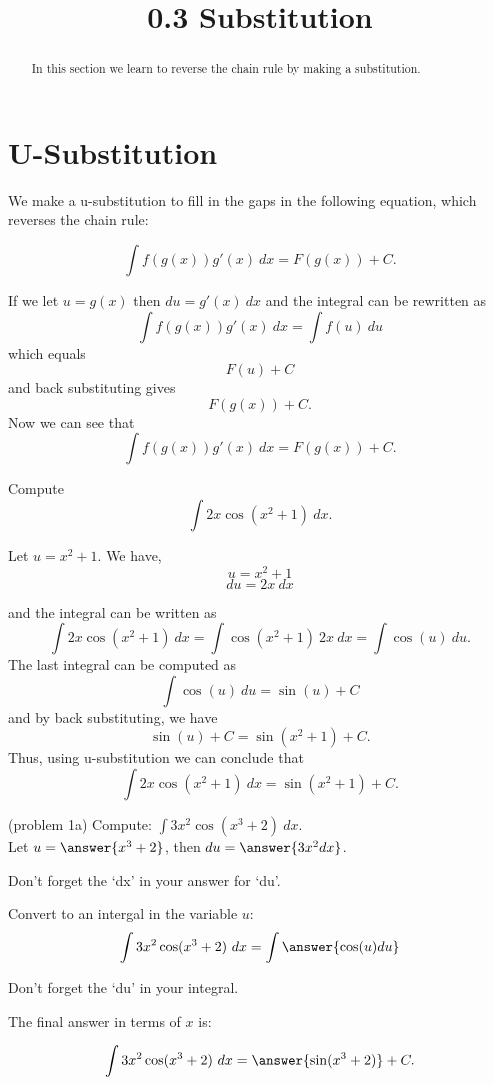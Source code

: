 \documentclass{ximera}
\title{0.3 Substitution}
\begin{document}
\begin{abstract}
In this section we learn to reverse the chain rule by making a substitution.
\end{abstract}

\maketitle

\section{U-Substitution}

We make a u-substitution to fill in the gaps in the following equation, which reverses the chain rule:

\[\int f(g(x))g'(x) \ dx = F(g(x)) + C. \]

If we let $ u = g(x)$ then $du = g'(x) \ dx$ and the integral can be rewritten as
\[\int f(g(x))g'(x) \ dx = \int f(u) \ du \]
which equals
\[F(u) + C\]
and back substituting gives
\[F(g(x)) + C. \]
Now we can see that
\[\int f(g(x))g'(x) \ dx = F(g(x)) + C. \]



\begin{example}[example 1]
Compute 
\[\int 2x\cos(x^2 + 1) \ dx.\]

Let $u = x^2 + 1$.  We have,
\[u = x^2 + 1\]
\[du = 2x \ dx\]

and the integral can be written as 
\[\int 2x\cos(x^2 + 1) \ dx = \int \cos(x^2 + 1) \ 2x\  dx = \int \cos(u) \ du.\]
The last integral can be computed as 
\[\int \cos(u) \ du = \sin(u) + C\]
and by back substituting, we have 
\[\sin(u) + C = \sin(x^2 + 1) + C.\]
Thus, using u-substitution we can conclude that
\[\int 2x\cos(x^2 + 1) \ dx =  \sin(x^2 + 1) + C.\]
\end{example}

\begin{problem}(problem 1a) Compute: $\displaystyle{\int 3x^2\cos(x^3 + 2) \ dx.}$\\
Let $u = \answer{x^3 + 2}$, then $du = \answer{3x^2 dx}$.\\
\begin{hint}
Don't forget the `dx' in your answer for `du'.
\end{hint}
Convert to an intergal in the variable $u$:
\[\int 3x^2\cos(x^3 + 2) \ dx = \int\answer{\cos(u) du}\]
\begin{hint}
Don't forget the `du' in your integral.
\end{hint}
The final answer in terms of $x$ is:

\[\int 3x^2\cos(x^3 + 2) \ dx = \answer{\sin(x^3 + 2)} +C.\]
\end{problem}
\end{document}
